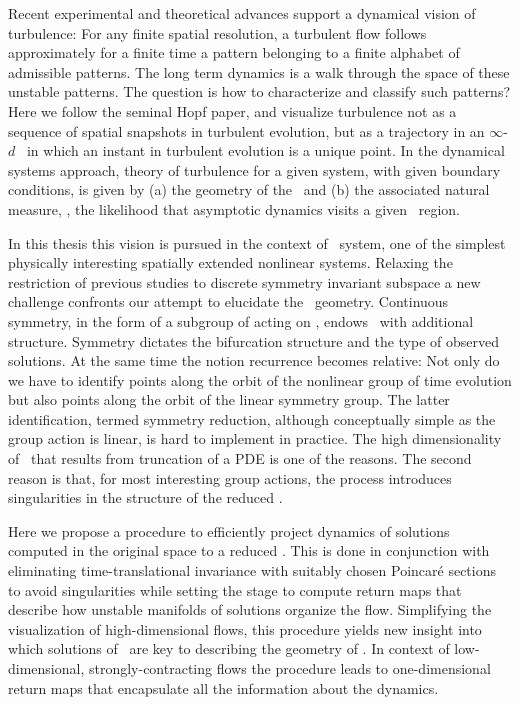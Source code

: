 

Recent experimental and theoretical advances
support a dynamical vision of turbulence:
For any finite  spatial resolution, a turbulent flow follows approximately for a finite time
a pattern belonging to a { finite alphabet} of admissible patterns.
The long term dynamics is a {walk through the space of these unstable patterns}.
The question is how to characterize and classify such patterns?
Here we follow the seminal Hopf paper, and  visualize
turbulence not as  a sequence of spatial snapshots in turbulent evolution,
but as a trajectory in an  $\infty$-$d$ \statesp\ in which an
instant in turbulent evolution is a {unique} point. In the dynamical systems approach,
theory of turbulence for a given system, with given boundary conditions,
is given by (a) the geometry of the \statesp\ and (b) the associated natural measure,
\ie, the likelihood that asymptotic dynamics visits a given \statesp\ region.

In this thesis this vision is pursued in the context of \KS\
system, one of the simplest physically interesting spatially
extended nonlinear systems. Relaxing the restriction of
previous studies to discrete
symmetry invariant subspace a new challenge confronts our
attempt to elucidate the \statesp\ geometry. Continuous
symmetry, in the form of a subgroup of  acting on
\statesp, endows \statesp\ with additional structure.
Symmetry dictates the bifurcation structure and the type of
observed solutions. At the same time the notion recurrence becomes
relative: Not only do we have to identify points along the
orbit of the nonlinear group of time evolution but also points
along the orbit of the linear symmetry group. The latter
identification, termed symmetry reduction, although
conceptually simple as the group action is linear, is hard to
implement in practice. The high dimensionality of \statesp\
that results from truncation of a PDE is one of the reasons.
The second reason is that, for most interesting group actions,
the process introduces singularities in the structure of the
reduced \statesp.

Here we propose a procedure to efficiently project dynamics of
solutions computed in the original space to a reduced \statesp.
This is done in conjunction with eliminating time-translational
invariance with suitably chosen Poincar\'e sections to avoid
singularities while setting the stage to compute return maps
that describe how unstable manifolds of solutions organize the
flow. Simplifying the visualization of high-dimensional flows,
this procedure yields new insight into which solutions of \KSe\
are key to describing the geometry of \statesp. In context of
low-dimensional, strongly-contracting flows the procedure leads
to one-dimensional return maps that encapsulate all the
information about the dynamics.
